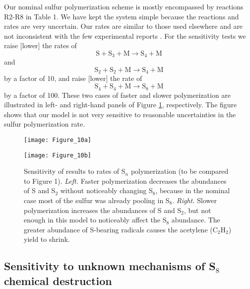 \documentclass[preprint]{aastex}
\newcounter{reaction}
\begin{document}
Our nominal sulfur polymerization scheme is mostly encompassed by reactions R2-R8 in Table 1.
We have kept the system simple because the reactions and rates are very uncertain.
Our rates are similar to those used elsewhere \citep[e.g.,][]{Moses2002,Yung2009} and are not inconsistent
with the few experimental reports \citep{Fair1969,Langford1972,Langford1973,Nicholas1979}.
For the sensitivity tests we raise [lower] the rates of
\begin{equation}\tag{R4}
\mathrm{S}+\mathrm{S}_3+\mathrm{M} \rightarrow \mathrm{S}_4 +\mathrm{M}
\end{equation}
and 
\begin{equation}\tag{R5}
\mathrm{S}_2+\mathrm{S}_2+\mathrm{M} \rightarrow \mathrm{S}_4 +\mathrm{M}
\end{equation}
by a factor of 10, and raise [lower] the rate of
\begin{equation}\tag{R7}
 \mathrm{S}_4+\mathrm{S}_4+\mathrm{M} \rightarrow \mathrm{S}_8 +\mathrm{M}
\end{equation}
 by a factor of 100. 
 These two cases of faster and slower polymerization are illustrated in left- and right-hand
 panels of Figure \ref{polymerize}, respectively.
 The figure shows that our model is not very sensitive to reasonable uncertainties in the sulfur polymerization rate.

\begin{figure}[!htb]
 \centering
 \begin{minipage}[c]{0.49\textwidth}
   \centering
  \texttt{[image: Figure\_10a]} 
 \end{minipage}
 \begin{minipage}[c]{0.49\textwidth}
   \centering
 \texttt{[image: Figure\_10b]} 
 \end{minipage}
  \caption{\small Sensitivity of results to rates of S$_n$ polymerization (to be compared to Figure 1).
   {\it Left.} Faster polymerization decreases the abundances of S and S$_2$ without noticeably changing
   S$_8$, because in the nominal case most of the sulfur was already pooling in S$_8$.
  {\it Right.} Slower polymerization increases the abundances of S and S$_2$, but not enough in this model
  to noticeably affect the S$_8$ abundance.  The greater abundance of S-bearing radicals 
  causes the acetylene (C$_2$H$_2$) yield to shrink.
  }
\label{polymerize}
\end{figure}

\subsection{Sensitivity to unknown mechanisms of S$_8$ chemical destruction}
\end{document}

